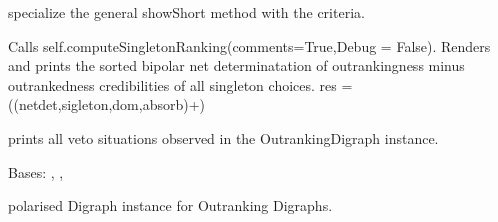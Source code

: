 \documentclass[letterpaper,10pt,english]{sphinxmanual}
\begin{document}
\begin{fulllineitems}
\begin{fulllineitems}
\end{fulllineitems}


\begin{fulllineitems}
\label{techDoc:outrankingDigraphs.OutrankingDigraph.showShort}
specialize the general showShort method with the criteria.

\end{fulllineitems}


\begin{fulllineitems}
\label{techDoc:outrankingDigraphs.OutrankingDigraph.showSingletonRanking}
Calls self.computeSingletonRanking(comments=True,Debug = False).
Renders and prints the sorted bipolar net determinatation of outrankingness
minus outrankedness credibilities of all singleton choices.
res = ((netdet,sigleton,dom,absorb)+)

\end{fulllineitems}


\begin{fulllineitems}
\label{techDoc:outrankingDigraphs.OutrankingDigraph.showVetos}
prints all veto situations observed in the OutrankingDigraph instance.

\end{fulllineitems}


\end{fulllineitems}


\begin{fulllineitems}
\label{techDoc:outrankingDigraphs.PolarisedOutrankingDigraph}
Bases: {\hyperref[techDoc:digraphs.PolarisedDigraph]{}}, {\hyperref[techDoc:outrankingDigraphs.OutrankingDigraph]{}}, {\hyperref[techDoc:perfTabs.PerformanceTableau]{}}

polarised Digraph instance for Outranking Digraphs.

\end{fulllineitems}
\end{document}
